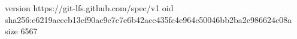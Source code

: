 version https://git-lfs.github.com/spec/v1
oid sha256:e6219acccb13ef90ac9c7c7e6b42acc435fc4e964c50046bb2ba2c986624c08a
size 6567
